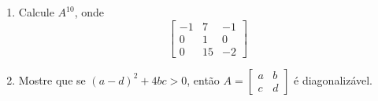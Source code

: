 \documentclass[a4paper,5pt]{amsbook}
\begin{document}
\begin{enumerate}

	\vspace{0.5cm}
	\item Calcule $A^{10}$, onde
		\[\begin{bmatrix}
			-1 & 7 & -1 \\
			0 & 1 & 0 \\
			0 & 15 & -2
		\end{bmatrix}\]

	\vspace{0.5cm}
	\item Mostre que se $(a-d)^2 + 4bc > 0$, ent\~ao
		$A = \begin{bmatrix}
			a & b \\
			c & d
		\end{bmatrix}$
		\'e diagonaliz\'avel.
\end{enumerate}
\end{document}
